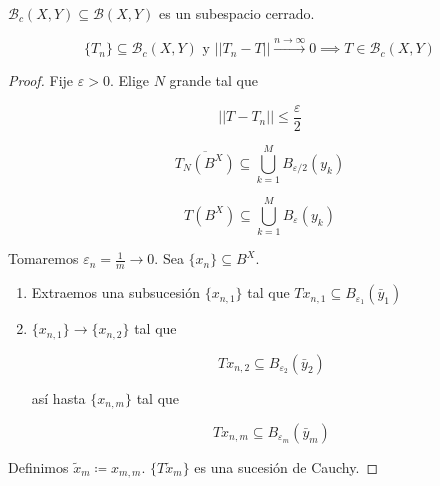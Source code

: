 \begin{ftheorem}
   $\mathcal{B}_c(X,Y)\subseteq \mathcal{B}(X,Y)$ es un subespacio cerrado. 

   \[\{T_n\}\subseteq \mathcal{B}_c(X,Y)\text{ y }||T_n-T||\xrightarrow{n\to\infty} 0\implies T\in \mathcal{B}_c(X,Y)\]
\end{ftheorem}

\begin{proof}






   Fije $\varepsilon>0$. Elige $N$ grande tal que 

   \[||T-T_n||\leq \frac{\varepsilon}{2}\]

   \[\overline{T_N(B^X)}\subseteq \bigcup_{k=1}^M B_{\varepsilon/2}(y_k)\]

   \[T(B^X)\subseteq \bigcup_{k=1}^M B_{\varepsilon}(y_k)\]

   Tomaremos $\varepsilon_n=\frac{1}{m}\to 0$. Sea $\{x_n\}\subseteq B^X$.

   \begin{enumerate}
       \item Extraemos una subsucesión $\{x_{n,1}\}$ tal que $Tx_{n,1}\subseteq B_{\varepsilon_1}(\bar y_1)$
       
       \item $\{x_{n,1}\}\to\{x_{n,2}\}$ tal que 
       
       \[Tx_{n,2}\subseteq B_{\varepsilon_2}(\bar y_2)\]

       así hasta $\{x_{n,m}\}$ tal que

       \[Tx_{n,m}\subseteq B_{\varepsilon_m}(\bar y_m)\]
   \end{enumerate}

   Definimos $\tilde x_m\coloneqq x_{m,m}$. $\{T\tilde x_m\}$ es una sucesión de Cauchy.
\end{proof}

